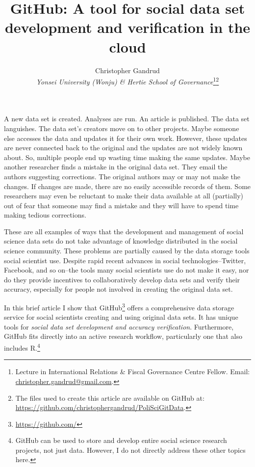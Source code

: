 \documentclass[twocolumn]{article}\usepackage{graphicx, color}
\title{GitHub: A tool for social data set development and verification in the cloud}
\author{Christopher Gandrud \\
                {\emph{Yonsei University (Wonju) \& Hertie School of Governance}}\footnote{Lecture in International Relations \& Fiscal Governance Centre Fellow. Email: \href{mailto:christopher.gandrud@gmail.com}{christopher.gandrud@gmail.com}.}\footnote{The files used to create this article are available on GitHub at: \url{https://github.com/christophergandrud/PoliSciGitData}.}}
\begin{document}
\maketitle

A new data set is created. Analyses are run. An article is published. The data set languishes. The data set's creators move on to other projects. Maybe someone else accesses the data and updates it for their own work. However, these updates are never connected back to the original and the updates are not widely known about. So, multiple people end up wasting time making the same updates. Maybe another researcher finds a mistake in the original data set. They email the authors suggesting corrections. The original authors may or may not make the changes. If changes are made, there are no easily accessible records of them. Some researchers may even be reluctant to make their data available at all (partially) out of fear that someone may find a mistake and they will have to spend time making tedious corrections. 

These are all examples of ways that the development and management of social science data sets do not take advantage of knowledge distributed in the social science community. These problems are partially caused by the data storage tools social scientist use. Despite rapid recent advances in social technologies--Twitter, Facebook, and so on--the tools many social scientists use do not make it easy, nor do they provide incentives to collaboratively develop data sets and verify their accuracy, especially for people not involved in creating the original data set.

In this brief article I show that GitHub\footnote{\url{https://github.com/}} offers a comprehensive data storage service for social scientists creating and using original data sets. It has unique tools for \emph{social data set development and accuracy verification}. Furthermore, GitHub fits directly into an active research workflow, particularly one that also includes R.\footnote{GitHub can be used to store and develop entire social science research projects, not just data. However, I do not directly address these other topics here.}
\end{document}
